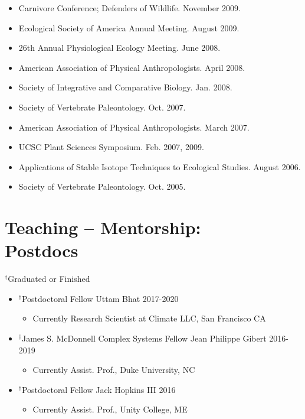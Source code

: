 \documentclass[margin,line,12pt]{res}
\begin{document}
\begin{resume}
\begin{itemize}
\item Carnivore Conference; Defenders of Wildlife. November 2009.

\item Ecological Society of America Annual Meeting. August 2009.

\item 26th Annual Physiological Ecology Meeting. June 2008.

\item American Association of Physical Anthropologists. April 2008.

\item Society of Integrative and Comparative Biology. Jan. 2008.

\item Society of Vertebrate Paleontology. Oct. 2007.

\item American Association of Physical Anthropologists. March 2007.

\item UCSC Plant Sciences Symposium. Feb. 2007, 2009.

\item Applications of Stable Isotope Techniques to Ecological Studies. August 2006.

\item Society of Vertebrate Paleontology. Oct. 2005.

\end{itemize}

\section{\sc Teaching -- Mentorship: \\ Postdocs}
{\footnotesize{${}^\dag$Graduated or Finished}}
\begin{itemize}
\item ${}^\dag$Postdoctoral Fellow Uttam Bhat \hfill 2017-2020
	\begin{itemize}  
		\item[] Currently Research Scientist at Climate LLC, San Francisco CA
	\end{itemize}
\item ${}^\dag$James S. McDonnell Complex Systems Fellow Jean Philippe Gibert \hfill 2016-2019
	\begin{itemize}  
		\item[] Currently Assist. Prof., Duke University, NC
	\end{itemize}  
\item ${}^\dag$Postdoctoral Fellow Jack Hopkins III \hfill 2016
	\begin{itemize}  
		\item[] Currently Assist. Prof., Unity College, ME
	\end{itemize}  
\end{itemize}


\end{resume}
\end{document}
